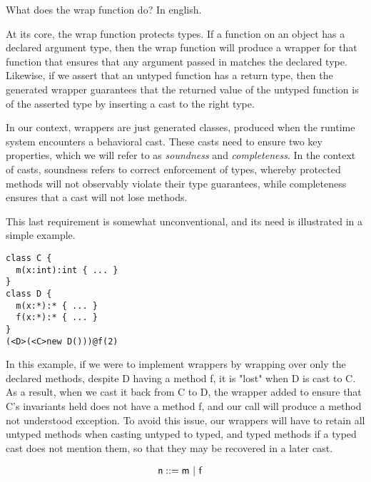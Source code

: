 \documentclass[a4paper,UKenglish,final]{tex/lipics-v2016}
\begin{document}
What does the wrap function do? In english.

At its core, the wrap function protects types. If a function on an object has a declared argument type, then the wrap function will produce a wrapper for that function that ensures that any argument passed in matches the declared type. Likewise, if we assert that an untyped function has a return type, then the generated wrapper guarantees that the returned value of the untyped function is of the asserted type by inserting a cast to the right type.

In our context, wrappers are just generated classes, produced when the runtime system encounters a behavioral cast. These casts need to ensure two key properties, which we will refer to as \emph{soundness} and \emph{completeness}. In the context of casts, soundness refers to correct enforcement of types, whereby protected methods will not observably violate their type guarantees, while completeness ensures that a cast will not lose methods.

This last requirement is somewhat unconventional, and its need is illustrated in a simple example. 

\begin{verbatim}
class C {
  m(x:int):int { ... }
}
class D {
  m(x:*):* { ... }
  f(x:*):* { ... }
}
(<D>(<C>new D()))@f(2)
\end{verbatim}

In this example, if we were to implement wrappers by wrapping over only the declared methods, despite D having a method f, it is "lost" when D is cast to C. As a result, when we cast it back from C to D, the wrapper added to ensure that C's invariants held does not have a method f, and our call will produce a method not understood exception. To avoid this issue, our wrappers will have to retain all untyped methods when casting untyped to typed, and typed methods if a typed cast does not mention them, so that they may be recovered in a later cast.

\hrulefill

\newcommand{\tfa}{\text{\emph{for every }}}
\newcommand{\wh}{\text{\emph{where}}}
\newcommand{\wc}{\text{wrapClass}}
\newcommand{\n}{\xt{n}}

\begin{align*}
{\sf{n}} &::= {\sf{m}} ~|~ {\sf{f}}
\end{align*}
\end{document}
